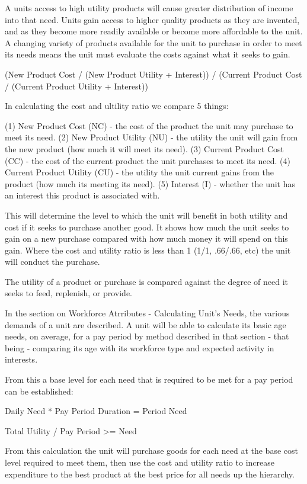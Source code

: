 A units access to high utility products will cause greater distribution of income into that need. Units gain access to higher quality products as they are invented, and as they become more readily available or become more affordable to the unit. A changing variety of products available for the unit to purchase in order to meet its needs means the unit must evaluate the costs against what it seeks to gain. 

(New Product Cost / (New Product Utility + Interest)) / (Current Product Cost / (Current Product Utility + Interest))

In calculating the cost and ultility ratio we compare 5 things:

(1) New Product Cost (NC) - the cost of the product the unit may purchase to meet its need.
(2) New Product Utility (NU) - the utility the unit will gain from the new product (how much it will meet its need).
(3) Current Product Cost (CC) - the cost of the current product the unit purchases to meet its need.
(4) Current Product Utility (CU) - the utility the unit current gains from the product (how much its meeting its need).
(5) Interest (I) - whether the unit has an interest this product is associated with.

This will determine the level to which the unit will benefit in both utility and cost if it seeks to purchase another good. It shows how much the unit seeks to gain on a new purchase compared with how much money it will spend on this gain. Where the cost and utility ratio is less than 1 (1/1, .66/.66, etc) the unit will conduct the purchase.

The utility of a product or purchase is compared against the degree of need it seeks to feed, replenish, or provide.

In the section on Workforce Atrributes - Calculating Unit's Needs, the various demands of a unit are described. A unit will be able to calculate its basic age needs, on average, for a pay period by method described in that section - that being - comparing its age with its workforce type and expected activity in interests.  
 
From this a base level for each need that is required to be met for a pay period can be established:

Daily Need * Pay Period Duration = Period Need

Total Utility / Pay Period >= Need


From this calculation the unit will purchase goods for each need at the base cost level required to meet them, then use the cost and utility ratio to increase expenditure to the best product at the best price for all needs up the hierarchy.

